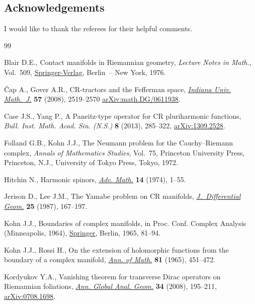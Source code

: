 \documentclass[pdftex]{sigma}
\numberwithin{equation}{section}
\begin{document}
\subsection*{Acknowledgements}

I would like to thank the referees for their helpful comments.

\begin{thebibliography}{99}
\footnotesize\itemsep=0pt

Blair D.E., Contact manifolds in {R}iemannian geometry, \textit{Lecture Notes
 in Math.}, Vol.~509, \href{https://doi.org/10.1007/BFb0079307}{Springer-Verlag}, Berlin~-- New York, 1976.


\v{C}ap A., Gover A.R., C{R}-tractors and the {F}efferman space,
 \href{https://doi.org/10.1512/iumj.2008.57.3359}{\textit{Indiana Univ. Math.~J.}} \textbf{57} (2008), 2519--2570 \href{https://arxiv.org/abs/math.DG/0611938}{arXiv:math.DG/0611938}.

Case J.S., Yang P., A {P}aneitz-type operator for {CR} pluriharmonic functions,
 \textit{Bull. Inst. Math. Acad. Sin. (N.S.)} \textbf{8} (2013), 285--322,
 \href{https://arxiv.org/abs/1309.2528}{arXiv:1309.2528}.

Folland G.B., Kohn J.J., The {N}eumann problem for the {C}auchy--{R}iemann
 complex, \textit{Annals of Mathematics Studies}, Vol.~75, Princeton
 University Press, Princeton, N.J., University of Tokyo Press, Tokyo, 1972.

Hitchin N., Harmonic spinors, \href{https://doi.org/10.1016/0001-8708(74)90021-8}{\textit{Adv. Math.}} \textbf{14} (1974), 1--55.

Jerison D., Lee J.M., The {Y}amabe problem on {CR} manifolds,
 \href{https://doi.org/10.4310/jdg/1214440849}{\textit{J.~Differential Geom.}} \textbf{25} (1987), 167--197.

Kohn J.J., Boundaries of complex manifolds, in Proc. {C}onf. {C}omplex
 {A}nalysis ({M}inneapolis, 1964), \href{https://doi.org/10.1007/978-3-642-48016-4_9}{Springer}, Berlin, 1965, 81--94.

Kohn J.J., Rossi H., On the extension of holomorphic functions from the
 boundary of a complex manifold, \href{https://doi.org/10.2307/1970624}{\textit{Ann. of Math.}} \textbf{81} (1965),
 451--472.

Kordyukov Y.A., Vanishing theorem for transverse {D}irac operators on
 {R}iemannian foliations, \href{https://doi.org/10.1007/s10455-008-9103-2}{\textit{Ann. Global Anal. Geom.}} \textbf{34} (2008),
 195--211, \href{https://arxiv.org/abs/0708.1698}{arXiv:0708.1698}.


\end{thebibliography}
\end{document}
